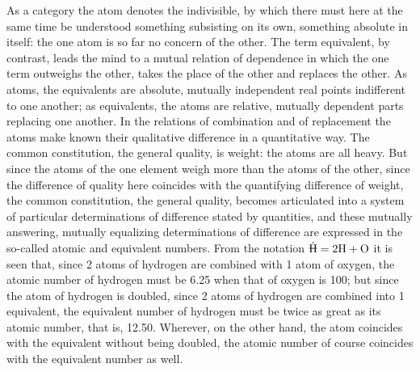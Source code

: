 \documentclass[12pt,a4paper]{book}
\begin{document}
As a category the atom denotes the indivisible, by which there must here at the
same time be understood something subsisting on its own, something absolute in
itself: the one atom is so far no concern of the other. The term equivalent, by
contrast, leads the mind to a mutual relation of dependence in which the one
term outweighs the other, takes the place of the other and replaces the other.
As atoms, the equivalents are absolute, mutually independent real points
indifferent to one another; as equivalents, the atoms are relative, mutually
dependent parts replacing one another. In the relations of combination and of
replacement the atoms make known their qualitative difference in a quantitative
way. The common constitution, the general quality, is weight: the atoms are all
heavy. But since the atoms of the one element weigh more than the atoms of the
other,
since the difference of quality here coincides with the quantifying difference
of weight, the common constitution, the general quality, becomes articulated
into a system of particular determinations of difference stated by quantities,
and these mutually answering, mutually equalizing determinations of difference
are expressed in the so-called atomic and equivalent numbers. From the notation
$\dot{\rlap{\rule[0.8ex]{0.75em}{0.4pt}}\mathrm{H}} =
2\mathrm{H} + \mathrm{O}$ it is seen that, since 2 atoms of hydrogen are
combined with 1 atom of oxygen, the atomic number of hydrogen must be 6.25 when
that of oxygen is 100; but since the atom of hydrogen is doubled, since 2 atoms
of hydrogen are combined into 1 equivalent, the equivalent number of hydrogen
must be twice as great as its atomic number, that is, 12.50. Wherever, on the
other hand, the atom coincides with the equivalent without being doubled, the
atomic number of course coincides with the equivalent number as well.
\end{document}
